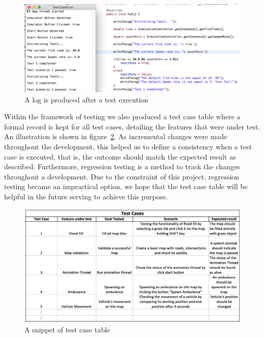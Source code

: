 \begin{figure}[h]
        \begin{center}
                \includegraphics[width=\textwidth]{img/testCase.png}
                \caption{A log is produced after a test execution}
        \label{fig:testCase}
        \end{center}
\end{figure}


Within the framework of testing we also produced a test case table where a formal record is kept for all test cases, detailing the features that were under test. An illustration is shown in figure~\ref{fig:testCaseTable}.  As incremental changes were made throughout the development, this helped us to define a consistency when a test case is executed, that is, the outcome should match the expected result as described.  Furthermore, regression testing is a method to track the changes throughout a development. Due to the constraint of this project, regression testing became an impractical option, we hope that the test case table will be helpful in the future serving to achieve this purpose.

\begin{figure}[h]
        \begin{center}
                \includegraphics[width=\textwidth]{img/testCaseTable.png}
                \caption{A snippet of test case table}
        \label{fig:testCaseTable}
        \end{center}
\end{figure}

